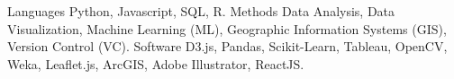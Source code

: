 \begin{cvskills}
  \cvskill
    {Languages}
    {Python, Javascript, SQL, R.}
\cvskill
    {Methods}
    {Data Analysis, Data Visualization, Machine Learning (ML), Geographic Information Systems (GIS), Version Control (VC).}
\cvskill
    {Software}
    {D3.js, Pandas, Scikit-Learn, Tableau, OpenCV, Weka, Leaflet.js, ArcGIS, Adobe Illustrator, ReactJS.}
\end{cvskills}
